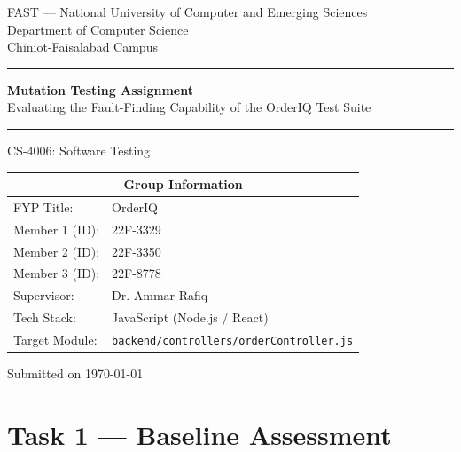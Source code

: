 \documentclass[12pt, a4paper]{article}
\begin{document}

\begin{titlepage}
  \centering
  \vspace*{1cm}

  {\large FAST --- National University of Computer and Emerging Sciences}\\[0.2cm]
  {\large Department of Computer Science}\\[0.1cm]
  {\normalsize Chiniot-Faisalabad Campus}

  \vspace{1.5cm}
  \rule{\linewidth}{0.4pt}
  \vspace{0.4cm}

  {\LARGE\bfseries Mutation Testing Assignment}\\[0.3cm]
  {\large Evaluating the Fault-Finding Capability of the OrderIQ Test Suite}

  \vspace{0.4cm}
  \rule{\linewidth}{0.4pt}

  \vspace{1cm}
  {\large CS-4006: Software Testing}\\[0.1cm]

\vspace{1.5cm}
\begin{tabular}{|l|l|}
  \hline
  \multicolumn{2}{|c|}{\textbf{Group Information}} \\
  \hline
  FYP Title:      & OrderIQ \\[0.3cm]
  Member 1 (ID):  & 22F-3329 \\[0.3cm]
  Member 2 (ID):  & 22F-3350 \\[0.3cm]
  Member 3 (ID):  & 22F-8778 \\[0.3cm]
  Supervisor:     & Dr. Ammar Rafiq \\[0.3cm]
  Tech Stack:     & JavaScript (Node.js / React) \\[0.3cm]
  Target Module:  & \texttt{backend/controllers/orderController.js} \\[0.3cm]
  \hline
\end{tabular}

  \vfill
  {\small Submitted on \today}
\end{titlepage}

\tableofcontents
\newpage

\section{Task 1 --- Baseline Assessment}
\end{document}
